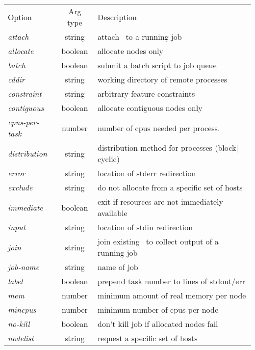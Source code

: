 \documentclass[10pt,onecolumn,times]{../common/llncs}
\begin{document}
{\begin{table}[!tb]
\begin{center}
  \begin{tabular}[t]{lcl}
   \hhline{---}
      Option & Arg type & Description \\
   \hhline{---}
      {\em attach}	   & string & attach \srun\ to a running job	      \\
      {\em allocate}	   & boolean& allocate nodes only		      \\
      {\em batch}	   & boolean& submit a batch script to job queue      \\
      {\em cddir}	   & string & working directory of remote processes   \\
      {\em constraint}     & string & arbitrary feature constraints	      \\
      {\em contiguous}	   & boolean& allocate contiguous nodes only	      \\
      {\em cpus-per-task } & number & number of cpus needed per process.      \\
      {\em distribution}   & string & distribution method for processes (block$|$cyclic) \\
      {\em error}	   & string & location of stderr redirection	      \\
      {\em exclude}	   & string & do not allocate from a specific set of hosts \\
      {\em immediate}	   & boolean& exit if resources are not immediately available  \\
      {\em input}	   & string & location of stdin redirection	      \\
      {\em join}	   & string & join existing \srun\ to collect output of a running job \\
      {\em job-name}	   & string & name of job 			      \\
      {\em label}	   & boolean& prepend task number to lines of stdout/err \\
      {\em mem}		   & number & minimum amount of real memory per node  \\
      {\em mincpus} 	   & number & minimum number of cpus per node         \\
      {\em no-kill}	   & boolean& don't kill job if allocated nodes fail  \\
      {\em nodelist}	   & string & request a specific set of hosts	      \\

\end{tabular}
\end{center}
\end{table}}
\end{document}

